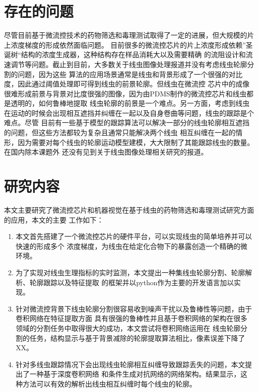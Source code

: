 \section{存在的问题}
\label{sec:intro:analog}
	 尽管目前基于微流控技术的药物筛选和毒理测试取得了一定的进展，但大规模的片上浓度梯度的形成依然面临问题。
	 目前很多的微流控芯片的片上浓度形成依赖”圣诞树“结构的浓度生成器，这种结构存在样品消耗大以及需要精确
的流阻设计和流速调节等问题。截止到目前，大多数关于线虫图像处理报道并没有考虑线虫轮廓分割的问题，因为这些
算法的应用场景通常是线虫和背景形成了一个很强的对比度，因此通过阈值处理即可得到线虫的前景轮廓。但线虫在微流控
芯片中的成像很难形成前景与背景对比度很强的图像，因为由PDMS制作的微流控芯片和线虫都是透明的，如何鲁棒地提取
线虫轮廓的前景是一个难点。另一方面，考虑到线虫在运动的时候会出现相互遮挡并纠缠在一起以及自身卷曲等问题，线虫的跟踪是个难点。尽管
目前有一些基于模型的跟踪算法可以解决一部分的线虫轮廓相互遮挡的问题，但这些方法都较为复杂且通常只能解决两个线虫
相互纠缠在一起的情形，因为需要对每个线虫的轮廓运动模型建模，大大限制了其能跟踪线虫的数量。在国内除本课题外
还没有见到关于线虫图像处理相关研究的报道。
\section{研究内容}
\label{sec:intro:org}
	本文主要研究了微流控芯片和机器视觉在基于线虫的药物筛选和毒理测试研究方面的应用，本文的主要
	工作如下：
	\begin{enumerate}
	  \item 本文首先搭建了一个微流控芯片的硬件平台，可以实现线虫的简单培养并可以快速的形成多个
	  浓度梯度，为线虫在给定化合物下的暴露创造一个精确的微环境。
	  \item 为了实现对线虫生理指标的实时监测，本文提出一种集线虫轮廓分割、轮廓解析、轮廓跟踪以及特征提取
	  的框架并以python作为主要的开发语言加以实现。
	  \item 针对微流控背景下线虫轮廓分割很容易收到噪声干扰以及鲁棒性等问题，由于卷积网络在特征提取方面
	  具有很强的鲁棒性并且基于卷积网络的架构在很多领域的分割任务中取得很大的成功，本文尝试将卷积网络运用在
	  线虫轮廓分割的任务，结构显示与基于背景减除的轮廓提取算法相比，像素误差下降了XX。
	  \item 针对多线虫跟踪情况下会出现线虫轮廓相互纠缠导致跟踪丢失的问题，本文提出了一种基于深度卷积网络
	  和条件生成对抗网络的网络架构。结果显示，这种方法可以有效的解析出线虫相互纠缠时每个线虫的轮廓。
	\end{enumerate}
